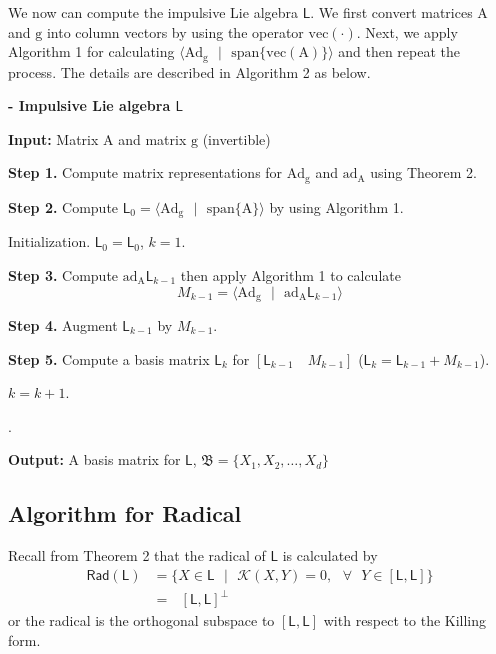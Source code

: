 \documentclass[11pt,a4paper]{article}
\begin{document}
We now can compute the impulsive Lie algebra $\mathsf{L}$. We first convert matrices $\mathrm{A}$ and $\mathrm{g}$ into column vectors by using the operator $\mathrm{vec}(\cdot)$. Next, we apply Algorithm 1 for calculating $\langle \mathrm{Ad}_\mathrm{g} \text{ }| \text{ } \mathrm{span}\{\mathrm{vec}(\mathrm{A})\} \rangle$ and then repeat the process. The details are described in Algorithm 2 as below.

\begin{algorithm}
\caption{\textbf{- Impulsive Lie algebra $\mathsf{L}$}}
\begin{algorithmic}

\State \textbf{Input:} Matrix $\mathrm{A}$ and matrix $\mathrm{g}$ (invertible)

\State \quad \quad \textbf{Step 1.} Compute matrix representations for $\mathrm{Ad}_{\mathrm{g}}$ and $\mathrm{ad}_{\mathrm{A}}$ using Theorem 2.

\State \quad \quad \textbf{Step 2.} Compute
$\mathsf{L}_0 = \langle \mathrm{Ad}_{\mathrm{g}} \text{ }| \text{ } \mathrm{span}\{\mathrm{A}\} \rangle$ by using Algorithm 1.

\State \quad \quad Initialization. $\mathsf{L}_0 = \mathsf{L}_0$, $k =1$.

\Repeat

\State \quad \textbf{Step 3.} Compute $\mathrm{ad}_{\mathrm{A}}\mathsf{L}_{k-1}$ then apply Algorithm 1 to calculate
$$M_{k-1} = \langle \mathrm{Ad}_{\mathrm{g}} \text{ }| \text{ } \mathrm{ad}_{\mathrm{A}}\mathsf{L}_{k-1} \rangle$$

\State \quad \textbf{Step 4.} Augment $\mathsf{L}_{k-1}$ by $M_{k-1}$.

\State \quad \textbf{Step 5.}  Compute a basis matrix 
$\mathsf{L}_k $ for $[\mathsf{L}_{k-1} \quad M_{k-1}]$
($\mathsf{L}_k = \mathsf{L}_{k-1} + M_{k-1}$).

\State \quad $k = k+1$.

.

\State \textbf{Output:} A basis matrix for $\mathsf{L}$, $\mathfrak{B} = \{X_1, X_2, \dots, X_d \}$
\end{algorithmic}
\end{algorithm}

%
\subsection{Algorithm for Radical}
\qquad Recall from Theorem 2 that the radical of $\mathsf{L}$ is calculated by
\begin{align*}
\mathsf{Rad}(\mathsf{L}) & = \{ X \in \mathsf{L} \text{ } \lvert \text{ } \mathcal{K}(X,Y) = 0, \text{ } \forall  \text{ } Y \in [\mathsf{L},\mathsf{L}]  \} \\
& = \text{ } [\mathsf{L},\mathsf{L}]^{\perp}
\end{align*}
or the radical is the orthogonal subspace to $[\mathsf{L},\mathsf{L}]$ with respect to the Killing form.\\
\end{document}
